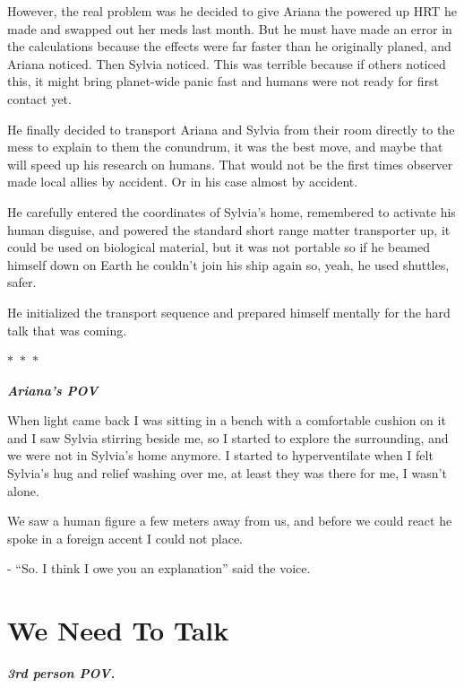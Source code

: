 \documentclass[hidelinks,12pt,a4paper]{book}
\newcommand\sep{\begin{center}
  \boldmath $\ast$~$\ast$~$\ast$
\end{center}}
\begin{document}
However, the real problem was he decided to give Ariana the powered up HRT he made and 
swapped out her meds last month. But he must have made an error in the calculations because the effects 
were far faster than he originally planed, and Ariana noticed. Then Sylvia noticed. This was terrible
 because if others noticed this, it might bring planet-wide panic fast and humans were not ready for first contact yet.\par
 \bigskip

He finally decided to transport Ariana and Sylvia from their room directly to the mess to explain to them the conundrum, 
it was the best move, and maybe that will speed up his research on humans. That would not be the first times 
observer made local allies by accident. Or in his case almost by accident. \par
\bigskip

He carefully entered the coordinates of Sylvia's home, remembered to activate his human disguise, 
and powered the standard short range matter transporter up, it could be used on biological material, 
but it was not portable so if he beamed himself down on Earth he couldn't join his ship again so, yeah, he used shuttles,
  safer.\par
  \bigskip

He initialized the transport sequence and prepared himself mentally for the hard talk that was coming.

\sep

\textit{\textbf{Ariana's POV}}\par
\bigskip

When light came back I was sitting in a bench with a comfortable cushion on it and I saw Sylvia stirring 
beside me, so I started to explore the surrounding, and we were not in Sylvia's home anymore. 
I started to hyperventilate when I felt Sylvia's hug and relief washing over me, at least they was there for me, 
I wasn't alone.\par
\bigskip

We saw a human figure a few meters away from us, and before we could react he spoke in a foreign accent I could not place.\par
\bigskip

- “So. I think I owe you an explanation” said the voice.
\chapter{We Need To Talk}
\textit{\textbf{3rd person POV.}}\par
\bigskip
\end{document}
